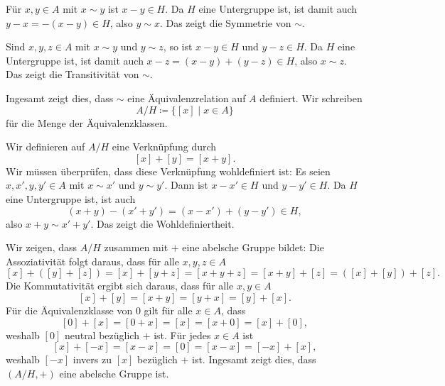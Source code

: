 Für $x,y \in A$ mit $x \sim y$ ist $x-y \in H$. Da $H$ eine Untergruppe ist, ist damit auch $y-x = -(x-y) \in H$, also $y \sim x$. Das zeigt die Symmetrie von $\sim$.

Sind $x,y,z \in A$ mit $x \sim y$ und $y \sim z$, so ist $x-y \in H$ und $y-z \in H$. Da $H$ eine Untergruppe ist, ist damit auch $x-z = (x-y)+(y-z) \in H$, also $x \sim z$. Das zeigt die Transitivität von $\sim$.

Ingesamt zeigt dies, dass $\sim$ eine Äquivalenzrelation auf $A$ definiert. Wir schreiben
\[
 A/H
 \coloneqq \{[x] \mid x \in A\}
\]
für die Menge der Äquivalenzklassen.

Wir definieren auf $A/H$ eine Verknüpfung durch
\[
 [x]+[y] = [x+y].
\]
Wir müssen überprüfen, dass diese Verknüpfung wohldefiniert ist: Es seien $x, x', y, y' \in A$ mit $x \sim x'$ und $y \sim y'$. Dann ist $x-x' \in H$ und $y-y' \in H$. Da $H$ eine Untergruppe ist, ist auch
\[
 (x+y)-(x'+y') = (x-x') + (y-y') \in H,
\]
also $x+y \sim x'+y'$. Das zeigt die Wohldefiniertheit.

Wir zeigen, dass $A/H$ zusammen mit $+$ eine abelsche Gruppe bildet: Die Assoziativität folgt daraus, dass für alle $x,y,z \in A$
\[
 [x] + ([y] + [z])
 = [x] + [y+z]
 = [x+y+z]
 = [x+y] + [z]
 = ([x] + [y]) + [z].
\]
Die Kommutativität ergibt sich daraus, dass für alle $x,y \in A$
\[
 [x] + [y] = [x+y] = [y+x] = [y] + [x].
\]
Für die Äquivalenzklasse von $0$ gilt für alle $x \in A$, dass
\[
 [0] + [x] = [0+x] = [x] = [x+0] = [x] + [0], 
\]
weshalb $[0]$ neutral bezüglich $+$ ist. Für jedes $x \in A$ ist
\[
 [x] + [-x] = [x-x] = [0] = [x-x] = [-x] + [x],
\]
weshalb $[-x]$ invers zu $[x]$ bezüglich $+$ ist. Ingesamt zeigt dies, dass $(A/H, +)$ eine abelsche Gruppe ist.


